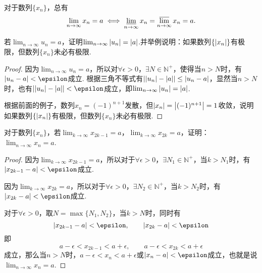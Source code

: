 \begin{corollary}
对于数列\(\{x_n\}\)，总有\[
	\lim_{n\to\infty} x_n = a
	\iff
	\varliminf_{n\to\infty} x_n
	= \varlimsup_{n\to\infty} x_n
	= a.
\]
\end{corollary}

\begin{example}
\def\l{\lim_{n\to\infty}}
若\(\l u_n = a\)，证明\(\l \abs{u_n} = \abs{a}\).并举例说明：如果数列\(\{\abs{x_n}\}\)有极限，但数列\(\{x_n\}\)未必有极限.
\begin{proof}
因为\(\l u_n = a\)，所以对\(\forall\epsilon>0\)，\(\exists N \in \mathbb{N}^+\)，使得当\(n>N\)时，有\(\abs{u_n-a}<\epsilon\)成立.
根据三角不等式有\(\abs{\abs{u_n}-\abs{a}} \leq \abs{u_n-a}\)，显然当\(n>N\)时，也有\(\abs{\abs{u_n}-\abs{a}}<\epsilon\)成立，即\(\l \abs{u_n} = \abs{a}\).

根据前面的例子，数列\(x_n = (-1)^{n+1}\)发散，但\(\abs{x_n} = \abs{(-1)^{n+1}} = 1\)收敛，说明如果数列\(\{\abs{x_n}\}\)有极限，但数列\(\{x_n\}\)未必有极限.
\end{proof}
\end{example}

\begin{example}
\def\l#1{\lim_{#1\to\infty}}
对于数列\(\{x_n\}\)，若\(\l{k}x_{2k-1}=a\)，\(\l{k}x_{2k}=a\)，证明：\(\l{n}x_n=a\).
\begin{proof}
因为\(\l{k}x_{2k-1}=a\)，所以对于\(\forall\epsilon>0\)，\(\exists N_1 \in \mathbb{N}^+\)，当\(k>N_1\)时，有\(\abs{x_{2k-1}-a}<\epsilon\)成立.

因为\(\l{k}x_{2k}=a\)，所以对于\(\forall\epsilon>0\)，\(\exists N_2 \in \mathbb{N}^+\)，当\(k>N_2\)时，有\(\abs{x_{2k}-a}<\epsilon\)成立.

对于\(\forall\epsilon>0\)，取\(N = \max\{N_1,N_2\}\)，当\(k>N\)时，同时有\[
\abs{x_{2k-1}-a}<\epsilon, \qquad \abs{x_{2k}-a}<\epsilon
\]即\[
a-\epsilon<x_{2k-1}<a+\epsilon, \qquad a-\epsilon<x_{2k}<a+\epsilon
\]成立，那么当\(n>N\)时，\(a-\epsilon<x_n<a+\epsilon\)或\(\abs{x_n-a}<\epsilon\)成立，也就是说\(\l{n}x_n=a\).
\end{proof}
\end{example}
